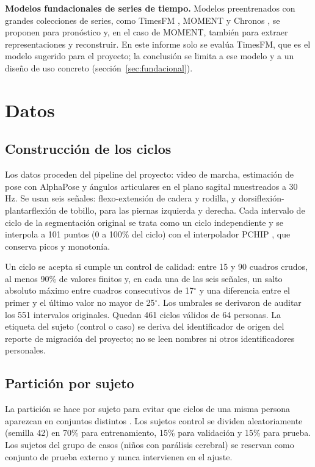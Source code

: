 \documentclass[11pt,a4paper]{amsart}
\newcommand{\gr}{$^{\circ}$}
\begin{document}
\textbf{Modelos fundacionales de series de tiempo.} Modelos preentrenados con grandes colecciones de series, como TimesFM \cite{das2024timesfm}, MOMENT \cite{goswami2024moment} y Chronos \cite{ansari2024chronos}, se proponen para pronóstico y, en el caso de MOMENT, también para extraer representaciones y reconstruir. En este informe solo se evalúa TimesFM, que es el modelo sugerido para el proyecto; la conclusión se limita a ese modelo y a un diseño de uso concreto (sección~\ref{sec:fundacional}).

\section{Datos}
\label{sec:datos}

\subsection{Construcción de los ciclos}

Los datos proceden del pipeline del proyecto: video de marcha, estimación de pose con AlphaPose \cite{fang2023alphapose} y ángulos articulares en el plano sagital muestreados a 30 Hz. Se usan seis señales: flexo-extensión de cadera y rodilla, y dorsiflexión-plantarflexión de tobillo, para las piernas izquierda y derecha. Cada intervalo de ciclo de la segmentación original se trata como un ciclo independiente y se interpola a 101 puntos (0 a 100\% del ciclo) con el interpolador PCHIP \cite{fritsch1980}, que conserva picos y monotonía.

Un ciclo se acepta si cumple un control de calidad: entre 15 y 90 cuadros crudos, al menos 90\% de valores finitos y, en cada una de las seis señales, un salto absoluto máximo entre cuadros consecutivos de 17\gr{} y una diferencia entre el primer y el último valor no mayor de 25\gr{}. Los umbrales se derivaron de auditar los 551 intervalos originales. Quedan 461 ciclos válidos de 64 personas. La etiqueta del sujeto (control o caso) se deriva del identificador de origen del reporte de migración del proyecto; no se leen nombres ni otros identificadores personales.

\subsection{Partición por sujeto}

La partición se hace por sujeto para evitar que ciclos de una misma persona aparezcan en conjuntos distintos \cite{saeb2017}. Los sujetos control se dividen aleatoriamente (semilla 42) en 70\% para entrenamiento, 15\% para validación y 15\% para prueba. Los sujetos del grupo de casos (niños con parálisis cerebral) se reservan como conjunto de prueba externo y nunca intervienen en el ajuste.
\end{document}
